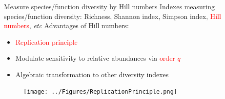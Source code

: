 \documentclass{beamer}
\begin{document}
\begin{frame}{Measure species/function diversity by Hill numbers}
    Indexes measuring species/function diversity:
    \newline
    Richness, Shannon index, Simpson index, \textcolor{red}{Hill numbers}, \textit{etc}
    \newline
    \newline
    Advantages of Hill numbers:
      \begin{itemize}
          \item \textcolor{red}{Replication principle}
          \item Modulate sensitivity to relative abundances via \textcolor{red}{order $q$}
          \item Algebraic transformation to other diversity indexes
      \end{itemize}
    \begin{figure}
        \texttt{[image: ../Figures/ReplicationPrinciple.png]}
    \end{figure}
\end{frame}

\end{document}
